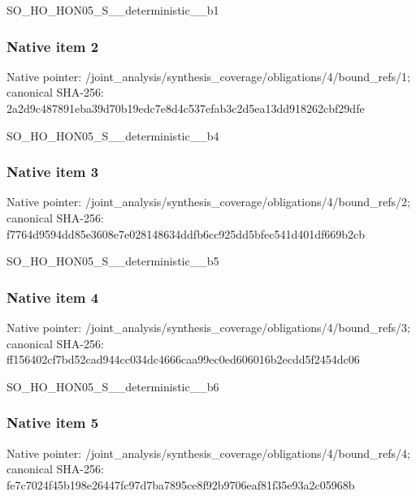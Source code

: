 \documentclass[10pt,a4paper]{article}
\begin{document}
\begingroup\raggedright\sloppy SO\_\allowbreak{}HO\_\allowbreak{}HON05\_\allowbreak{}S\_\allowbreak{}\_\allowbreak{}deterministic\_\allowbreak{}\_\allowbreak{}b1\par\endgroup

\subsubsection{Native item 2}
Native pointer: /joint\_\allowbreak{}analysis/synthesis\_\allowbreak{}coverage/obligations/4/bound\_\allowbreak{}refs/1; canonical SHA-256: 2a2d9c487891eba39d70b19edc7e8d4c537efab3c2d5ea13dd918262cbf29dfe

\begingroup\raggedright\sloppy SO\_\allowbreak{}HO\_\allowbreak{}HON05\_\allowbreak{}S\_\allowbreak{}\_\allowbreak{}deterministic\_\allowbreak{}\_\allowbreak{}b4\par\endgroup

\subsubsection{Native item 3}
Native pointer: /joint\_\allowbreak{}analysis/synthesis\_\allowbreak{}coverage/obligations/4/bound\_\allowbreak{}refs/2; canonical SHA-256: f7764d9594dd85e3608e7e028148634ddfb6cc925dd5bfec541d401df669b2cb

\begingroup\raggedright\sloppy SO\_\allowbreak{}HO\_\allowbreak{}HON05\_\allowbreak{}S\_\allowbreak{}\_\allowbreak{}deterministic\_\allowbreak{}\_\allowbreak{}b5\par\endgroup

\subsubsection{Native item 4}
Native pointer: /joint\_\allowbreak{}analysis/synthesis\_\allowbreak{}coverage/obligations/4/bound\_\allowbreak{}refs/3; canonical SHA-256: ff156402cf7bd52cad944cc034dc4666caa99ec0ed606016b2ecdd5f2454dc06

\begingroup\raggedright\sloppy SO\_\allowbreak{}HO\_\allowbreak{}HON05\_\allowbreak{}S\_\allowbreak{}\_\allowbreak{}deterministic\_\allowbreak{}\_\allowbreak{}b6\par\endgroup

\subsubsection{Native item 5}
Native pointer: /joint\_\allowbreak{}analysis/synthesis\_\allowbreak{}coverage/obligations/4/bound\_\allowbreak{}refs/4; canonical SHA-256: fe7c7024f45b198e26447fc97d7ba7895ce8f92b9706eaf81f35e93a2c05968b
\end{document}
